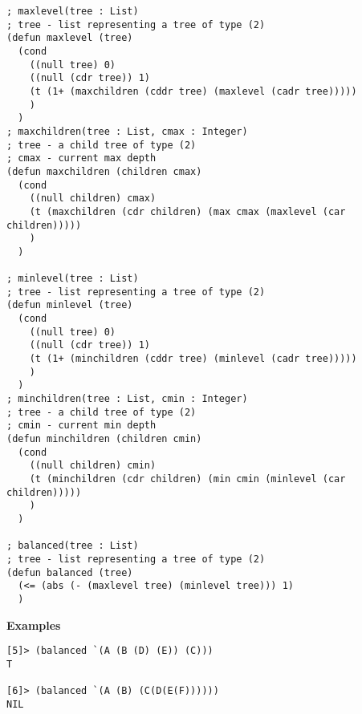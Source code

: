 \documentclass[11pt]{article}
\begin{document}
\begin{verbatim}
; maxlevel(tree : List)
; tree - list representing a tree of type (2)
(defun maxlevel (tree)
  (cond
    ((null tree) 0)
    ((null (cdr tree)) 1)
    (t (1+ (maxchildren (cddr tree) (maxlevel (cadr tree)))))
    )
  )
; maxchildren(tree : List, cmax : Integer)
; tree - a child tree of type (2)
; cmax - current max depth
(defun maxchildren (children cmax)
  (cond
    ((null children) cmax)
    (t (maxchildren (cdr children) (max cmax (maxlevel (car children)))))
    )
  )

; minlevel(tree : List)
; tree - list representing a tree of type (2)
(defun minlevel (tree)
  (cond
    ((null tree) 0)
    ((null (cdr tree)) 1)
    (t (1+ (minchildren (cddr tree) (minlevel (cadr tree)))))
    )
  )
; minchildren(tree : List, cmin : Integer)
; tree - a child tree of type (2)
; cmin - current min depth
(defun minchildren (children cmin)
  (cond
    ((null children) cmin)
    (t (minchildren (cdr children) (min cmin (minlevel (car children)))))
    )
  )

; balanced(tree : List)
; tree - list representing a tree of type (2)
(defun balanced (tree)
  (<= (abs (- (maxlevel tree) (minlevel tree))) 1)
  )

\end{verbatim}

\textbf{Examples}
\begin{verbatim}
[5]> (balanced `(A (B (D) (E)) (C)))
T

[6]> (balanced `(A (B) (C(D(E(F))))))
NIL

\end{verbatim}
\end{document}
